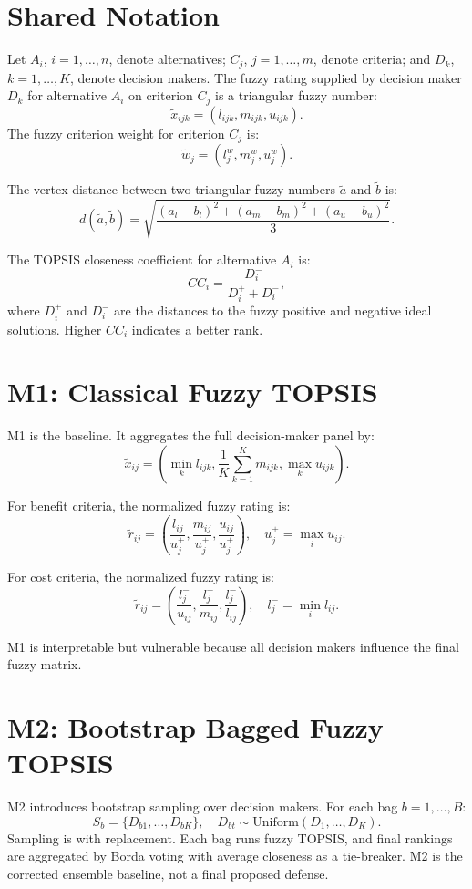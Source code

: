 \section{Shared Notation}
Let \(A_i\), \(i=1,\ldots,n\), denote alternatives; \(C_j\), \(j=1,\ldots,m\), denote criteria; and \(D_k\), \(k=1,\ldots,K\), denote decision makers. The fuzzy rating supplied by decision maker \(D_k\) for alternative \(A_i\) on criterion \(C_j\) is a triangular fuzzy number:
\[
\tilde{x}_{ijk}=(l_{ijk},m_{ijk},u_{ijk}).
\]
The fuzzy criterion weight for criterion \(C_j\) is:
\[
\tilde{w}_j=(l_j^w,m_j^w,u_j^w).
\]

The vertex distance between two triangular fuzzy numbers \(\tilde{a}\) and \(\tilde{b}\) is:
\[
d(\tilde{a},\tilde{b}) =
\sqrt{
\frac{(a_l-b_l)^2+(a_m-b_m)^2+(a_u-b_u)^2}{3}
}.
\]

The TOPSIS closeness coefficient for alternative \(A_i\) is:
\[
CC_i = \frac{D_i^-}{D_i^+ + D_i^-},
\]
where \(D_i^+\) and \(D_i^-\) are the distances to the fuzzy positive and negative ideal solutions. Higher \(CC_i\) indicates a better rank.

\section{M1: Classical Fuzzy TOPSIS}
M1 is the baseline. It aggregates the full decision-maker panel by:
\[
\tilde{x}_{ij} =
\left(
\min_k l_{ijk},
\frac{1}{K}\sum_{k=1}^{K} m_{ijk},
\max_k u_{ijk}
\right).
\]

For benefit criteria, the normalized fuzzy rating is:
\[
\tilde{r}_{ij} =
\left(
\frac{l_{ij}}{u_j^+},
\frac{m_{ij}}{u_j^+},
\frac{u_{ij}}{u_j^+}
\right),
\quad
u_j^+ = \max_i u_{ij}.
\]

For cost criteria, the normalized fuzzy rating is:
\[
\tilde{r}_{ij} =
\left(
\frac{l_j^-}{u_{ij}},
\frac{l_j^-}{m_{ij}},
\frac{l_j^-}{l_{ij}}
\right),
\quad
l_j^- = \min_i l_{ij}.
\]

M1 is interpretable but vulnerable because all decision makers influence the final fuzzy matrix.

\section{M2: Bootstrap Bagged Fuzzy TOPSIS}
M2 introduces bootstrap sampling over decision makers. For each bag \(b=1,\ldots,B\):
\[
S_b = \{D_{b1},\ldots,D_{bK}\}, \quad D_{bt}\sim \text{Uniform}(D_1,\ldots,D_K).
\]
Sampling is with replacement. Each bag runs fuzzy TOPSIS, and final rankings are aggregated by Borda voting with average closeness as a tie-breaker. M2 is the corrected ensemble baseline, not a final proposed defense.

